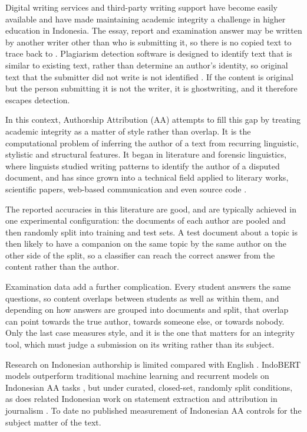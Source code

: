 \documentclass[runningheads]{llncs}
\begin{document}
Digital writing services and third-party writing support have become easily available and have made maintaining academic integrity a challenge in higher education in Indonesia. The essay, report and examination answer may be written by another writer other than who is submitting it, so there is no copied text to trace back to \cite{Pratiwi2021}. Plagiarism detection software is designed to identify text that is similar to existing text, rather than determine an author's identity, so original text that the submitter did not write is not identified \cite{He2024,Tyo2022}. If the content is original but the person submitting it is not the writer, it is ghostwriting, and it therefore escapes detection.

In this context, Authorship Attribution (AA) attempts to fill this gap by treating academic integrity as a matter of style rather than overlap. It is the computational problem of inferring the author of a text from recurring linguistic, stylistic and structural features. It began in literature and forensic linguistics, where linguists studied writing patterns to identify the author of a disputed document, and has since grown into a technical field applied to literary works, scientific papers, web-based communication and even source code \cite{Bogomolov2021,He2024,Huang2024}.

The reported accuracies in this literature are good, and are typically achieved in one experimental configuration: the documents of each author are pooled and then randomly split into training and test sets. A test document about a topic is then likely to have a companion on the same topic by the same author on the other side of the split, so a classifier can reach the correct answer from the content rather than the author.

Examination data add a further complication. Every student answers the same questions, so content overlaps between students as well as within them, and depending on how answers are grouped into documents and split, that overlap can point towards the true author, towards someone else, or towards nobody. Only the last case measures style, and it is the one that matters for an integrity tool, which must judge a submission on its writing rather than its subject.

Research on Indonesian authorship is limited compared with English \cite{Saputra2023,Saputra2024,Muliono2023}. IndoBERT models outperform traditional machine learning and recurrent models on Indonesian AA tasks \cite{Saputra2023,Saputra2024}, but under curated, closed-set, randomly split conditions, as does related Indonesian work on statement extraction and attribution in journalism \cite{Yohanes2024}. To date no published measurement of Indonesian AA controls for the subject matter of the text.
\end{document}
